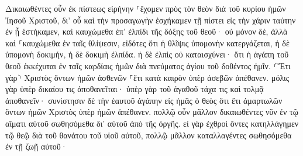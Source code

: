 \documentclass{openreader}
\begin{document}
Δικαιωθέντες οὖν ἐκ πίστεως εἰρήνην ⸀ἔχομεν πρὸς τὸν θεὸν διὰ τοῦ κυρίου ἡμῶν Ἰησοῦ Χριστοῦ, 
δι’ οὗ καὶ τὴν προσαγωγὴν ἐσχήκαμεν τῇ πίστει εἰς τὴν χάριν ταύτην ἐν ᾗ ἑστήκαμεν, καὶ καυχώμεθα ἐπ’ ἐλπίδι τῆς δόξης τοῦ θεοῦ· 
οὐ μόνον δέ, ἀλλὰ καὶ ⸀καυχώμεθα ἐν ταῖς θλίψεσιν, εἰδότες ὅτι ἡ θλῖψις ὑπομονὴν κατεργάζεται, 
ἡ δὲ ὑπομονὴ δοκιμήν, ἡ δὲ δοκιμὴ ἐλπίδα. 
ἡ δὲ ἐλπὶς οὐ καταισχύνει· ὅτι ἡ ἀγάπη τοῦ θεοῦ ἐκκέχυται ἐν ταῖς καρδίαις ἡμῶν διὰ πνεύματος ἁγίου τοῦ δοθέντος ἡμῖν. 
⸂Ἔτι γὰρ⸃ Χριστὸς ὄντων ἡμῶν ἀσθενῶν ⸀ἔτι κατὰ καιρὸν ὑπὲρ ἀσεβῶν ἀπέθανεν. 
μόλις γὰρ ὑπὲρ δικαίου τις ἀποθανεῖται· ὑπὲρ γὰρ τοῦ ἀγαθοῦ τάχα τις καὶ τολμᾷ ἀποθανεῖν· 
συνίστησιν δὲ τὴν ἑαυτοῦ ἀγάπην εἰς ἡμᾶς ὁ θεὸς ὅτι ἔτι ἁμαρτωλῶν ὄντων ἡμῶν Χριστὸς ὑπὲρ ἡμῶν ἀπέθανεν. 
πολλῷ οὖν μᾶλλον δικαιωθέντες νῦν ἐν τῷ αἵματι αὐτοῦ σωθησόμεθα δι’ αὐτοῦ ἀπὸ τῆς ὀργῆς. 
εἰ γὰρ ἐχθροὶ ὄντες κατηλλάγημεν τῷ θεῷ διὰ τοῦ θανάτου τοῦ υἱοῦ αὐτοῦ, πολλῷ μᾶλλον καταλλαγέντες σωθησόμεθα ἐν τῇ ζωῇ αὐτοῦ· 
\end{document}

